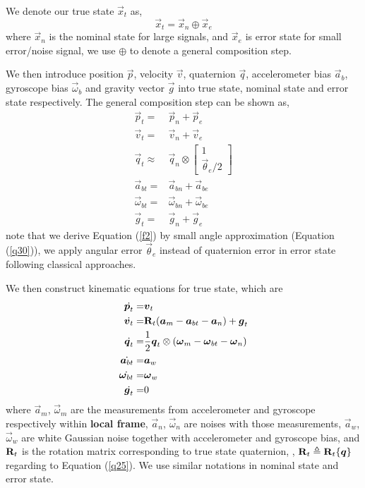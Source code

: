 We denote our true state $\vec{x}_t$ as,
\begin{equation}\label{f1}
	\vec{x}_t = \vec{x}_n \oplus \vec{x}_e
\end{equation}
where $\vec{x}_n$ is the nominal state for large signals, and $\vec{x}_e$ is error state for small error/noise signal, we use $\oplus$ to denote a general composition step. 

We then introduce position $\vec{p}$, velocity $\vec{v}$, quaternion $\vec{q}$, accelerometer bias $\vec{a}_b$, gyroscope bias $\vec{\omega}_b$ and gravity vector $\vec{g}$ into true state, nominal state and error state respectively. The general composition step can be shown as,
\begin{align}
	\vec{p}_t =& \vec{p}_n + \vec{p}_e \\
	\vec{v}_t =& \vec{v}_n + \vec{v}_e \\
	\vec{q}_t \approx& \vec{q}_n \otimes \begin{bmatrix} 1 \\ \vec{\theta}_e / 2 \end{bmatrix} \label{f2}\\
	\vec{a}_{bt} =& \vec{a}_{bn} + \vec{a}_{be} \\
	\vec{\omega}_{bt} =& \vec{\omega}_{bn} + \vec{\omega}_{be} \\ 
	\vec{g}_t =& \vec{g}_n + \vec{g}_e 
\end{align}
note that we derive Equation (\ref{f2}) by small angle approximation (Equation (\ref{q30})), we apply angular error $\vec{\theta}_e$ instead of quaternion error in error state following classical approaches.

We then construct kinematic equations for true state, which are
\begin{align}
	\label{f18}
	\dot{\boldsymbol{p}_t} =& \boldsymbol{v}_t \\
	\dot{\boldsymbol{v}_t} =& \mathbf{R}_t(\boldsymbol{a}_m - \boldsymbol{a}_{bt} - \boldsymbol{a}_n) + \boldsymbol{g}_t\\
	\dot{\boldsymbol{q}_t} =& \frac{1}{2}\boldsymbol{q}_t \otimes (\boldsymbol{\omega}_m - \boldsymbol{\omega}_{bt} - \boldsymbol{\omega}_n) \\
	\dot{\boldsymbol{a}_{bt}} =& \boldsymbol{a}_w \\
	\dot{\boldsymbol{\omega}_{bt}} =& \boldsymbol{\omega}_{w} \\ 
	\label{f19}
	\dot{\boldsymbol{g}_t} =& 0 
\end{align}
where $\vec{a}_m$, $\vec{\omega}_m$ are the measurements from accelerometer and gyroscope respectively within \textbf{local frame}, $\vec{a}_n$, $\vec{\omega}_n$ are noises with those measurements, $\vec{a}_w$, $\vec{\omega}_w$ are white Gaussian noise together with accelerometer and gyroscope bias, and $\mathbf{R}_t$ is the rotation matrix corresponding to true state quaternion, \ie, $\mathbf{R}_t \triangleq \mathbf{R}_t\{ \boldsymbol{q} \}$ regarding to Equation (\ref{q25}). We use similar notations in nominal state and error state. 

